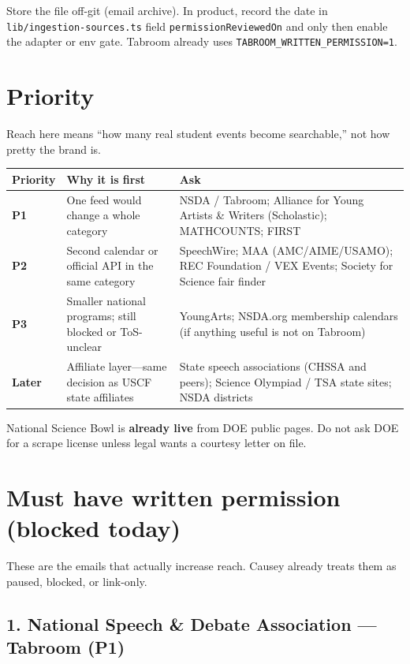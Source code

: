 \documentclass[11pt]{article}
\begin{document}
Store the file off-git (email archive). In product, record the date in
\texttt{lib/ingestion-sources.ts} field \texttt{permissionReviewedOn} and only then
enable the adapter or env gate. Tabroom already uses
\texttt{TABROOM\_WRITTEN\_PERMISSION=1}.

\section*{Priority}

Reach here means ``how many real student events become searchable,'' not how pretty the brand is.

\begin{center}
\begin{tabularx}{\textwidth}{@{}l Y Y@{}}
\toprule
\textbf{Priority} & \textbf{Why it is first} & \textbf{Ask} \\
\midrule
\textbf{P1} & One feed would change a whole category
  & NSDA / Tabroom; Alliance for Young Artists \& Writers (Scholastic); MATHCOUNTS; FIRST \\[0.4em]
\textbf{P2} & Second calendar or official API in the same category
  & SpeechWire; MAA (AMC/AIME/USAMO); REC Foundation / VEX Events; Society for Science fair finder \\[0.4em]
\textbf{P3} & Smaller national programs; still blocked or ToS-unclear
  & YoungArts; NSDA.org membership calendars (if anything useful is not on Tabroom) \\[0.4em]
\textbf{Later} & Affiliate layer---same decision as USCF state affiliates
  & State speech associations (CHSSA and peers); Science Olympiad / TSA state sites; NSDA districts \\
\bottomrule
\end{tabularx}
\end{center}

National Science Bowl is \textbf{already live} from DOE public pages. Do not ask DOE for a scrape license unless legal wants a courtesy letter on file.

\section*{Must have written permission (blocked today)}

These are the emails that actually increase reach. Causey already treats them as paused, blocked, or link-only.

\subsection*{1. National Speech \& Debate Association --- Tabroom (P1)}
\end{document}
